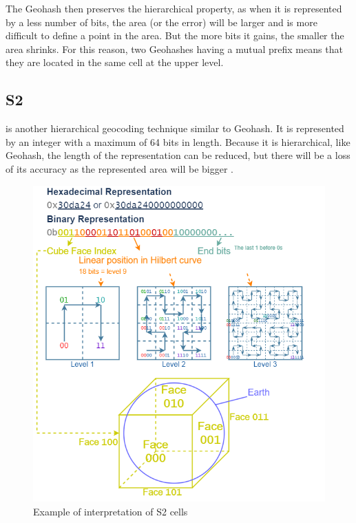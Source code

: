 \npara The Geohash then preserves the hierarchical property, as when it is represented by a less number of bits, the area (or the error) will be larger and is more difficult to define a point in the area.
But the more bits it gains, the smaller the area shrinks.
For this reason, two Geohashes having a mutual prefix means that they are located in the same cell at the upper level.

\subsection{S2}

\npara {} is another hierarchical geocoding technique similar to Geohash.
It is represented by an integer with a maximum of 64 bits in length.
Because it is hierarchical, like Geohash, the length of the representation can be reduced, but there will be a loss of its accuracy as the represented area will be bigger \citep{GeofencesBlockchain}.

\begin{figure}[htb!]
    \centering
    \includegraphics[width=\textwidth]{images/BackgroundS2.png}
    \caption{Example of interpretation of S2 cells}
    \label{fig:BackgroundS2}
\end{figure}

